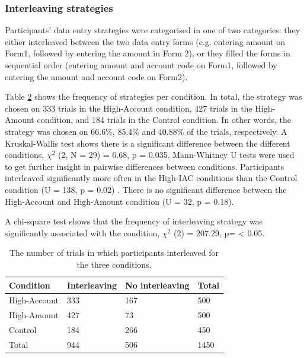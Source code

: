 \begin{table}
\begin{enumerate}
\subsubsection{Interleaving strategies}

Participants' data entry strategies were categorised in one of two categories: they either interleaved between the two data entry forms (e.g. entering amount on Form1, followed by entering the amount in Form 2), or they filled the forms in sequential order (entering amount and account code on Form1, followed by entering the amount and account code on Form2).

Table \ref{table:ch34_Study5interleavingfreqtbl} shows the frequency of strategies per condition. In total, the strategy was chosen on 333 trials in the High-Account condition, 427 trials in the High-Amount condition, and 184 trials in the Control condition. In other words, the strategy was chosen on 66.6\%, 85.4\% and 40.88\% of the trials, respectively. A Kruskal-Wallis test shows there is a significant difference between the different conditions,  $\chi^2$ (2, N = 29) = 6.68, p = 0.035. Mann-Whitney U tests were used to get further insight in pairwise differences between conditions. Participants interleaved significantly more often in the High-IAC conditions than the Control condition  (U = 138, p = 0.02) . There is no significant difference between the High-Account and High-Amount condition (U = 32, p = 0.18).

A chi-square test shows that the frequency of interleaving strategy was significantly associated with the condition, $\chi^2$  (2) = 207.29, p= < 0.05.

\begin{table}[]
\centering
\label{table:ch34_Study5interleavingfreqtbl}
\begin{tabular}{|l|l|l|l|}
\hline
Condition    & Interleaving & No interleaving & Total \\ \hline
High-Account & 333          & 167             & 500   \\ \hline
High-Amount  & 427          & 73              & 500   \\ \hline
Control      & 184          & 266             & 450   \\ \hline
Total             & 944          & 506             & 1450  \\ \hline
\end{tabular}
\caption{The number of trials in which participants interleaved for the three conditions.}
\end{table}


\end{enumerate}
\end{table}
